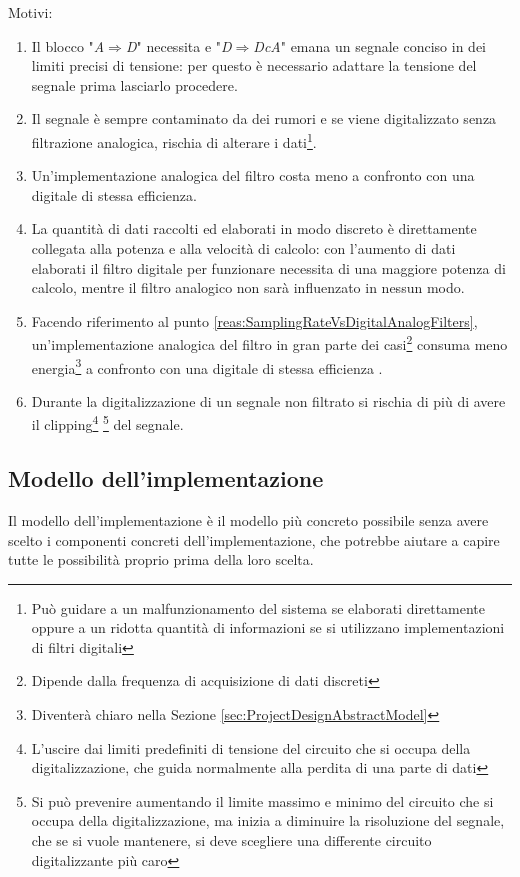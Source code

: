 \documentclass[a4paper, 10pt, final]{article} %
\begin{document}
    \nopagebreak
    \noindent Motivi:
    \begin{enumerate}[label=\emph{(\arabic*)}]
        \item Il blocco "\emph{A$\Rightarrow$D}" necessita e "\emph{D$\Rightarrow$DcA}" emana un segnale conciso in dei limiti precisi di tensione: per questo \`{e} necessario adattare la tensione del segnale prima lasciarlo procedere.
        \item Il segnale \`{e} sempre contaminato da dei rumori e se viene digitalizzato senza filtrazione analogica, rischia di alterare i dati\footnote{Pu\`{o} guidare a un malfunzionamento del sistema se elaborati direttamente oppure a un ridotta quantit\`{a} di informazioni se si utilizzano implementazioni di filtri digitali}.
        \item Un'implementazione analogica del filtro costa meno a confronto con una digitale di stessa efficienza.
        \item La quantit\`{a} di dati raccolti ed elaborati in modo discreto \`{e} direttamente collegata alla potenza e alla velocit\`{a} di calcolo: con l'aumento di dati elaborati il filtro digitale per funzionare necessita di una maggiore potenza di calcolo, mentre il filtro analogico non sar\`{a} influenzato in nessun modo. \label{reas:SamplingRateVsDigitalAnalogFilters}
        \item Facendo riferimento al punto \ref{reas:SamplingRateVsDigitalAnalogFilters}, un'implementazione analogica del filtro in gran parte dei casi\footnote{Dipende dalla frequenza di acquisizione di dati discreti} consuma meno energia\footnote{Diventer\`{a} chiaro nella Sezione \ref{sec:ProjectDesignAbstractModel}} a confronto con una digitale di stessa efficienza .
        \item Durante la digitalizzazione di un segnale non filtrato si rischia di pi\`{u} di avere il clipping\footnote{L'uscire dai limiti predefiniti di tensione del circuito che si occupa della digitalizzazione, che guida normalmente alla perdita di una parte di dati} \footnote{Si pu\`{o} prevenire aumentando il limite massimo e minimo del circuito che si occupa della digitalizzazione, ma inizia a diminuire la risoluzione del segnale, che se si vuole mantenere, si deve scegliere una differente circuito digitalizzante pi\`{u} caro} del segnale.
    \end{enumerate}

    \subsection{Modello dell'implementazione}\label{sec:ProjectDesignImplementationModel}
    Il modello dell'implementazione \`{e} il modello pi\`{u} concreto possibile senza avere scelto i componenti concreti dell'implementazione, che potrebbe aiutare a capire tutte le possibilit\`{a} proprio prima della loro scelta.
\end{document}
